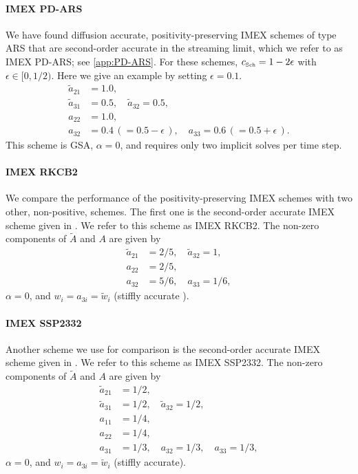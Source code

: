 \paragraph{IMEX PD-ARS}

We have found diffusion accurate, positivity-preserving IMEX schemes of type ARS that are second-order accurate in the streaming limit, which we refer to as IMEX PD-ARS; see \ref{app:PD-ARS}.  
For these schemes, $c_{\mbox{\tiny Sch}}= 1 - 2\epsilon$ with $\epsilon \in [0, 1/2)$.
Here we give an example by setting $\epsilon=0.1$.
\begin{align*}
  \tilde{a}_{21} & = 1.0, \\
  \tilde{a}_{31} & = 0.5, \quad \tilde{a}_{32} = 0.5, \\
  a_{22} & = 1.0, \nonumber \\
  a_{32} & = 0.4 \,( = 0.5 - \epsilon\,), \quad a_{33} = 0.6 \,( = 0.5 + \epsilon\,). 
\end{align*}
This scheme is GSA, $\alpha=0$, and requires only two implicit solves per time step.  

\paragraph{IMEX RKCB2}

We compare the performance of the positivity-preserving IMEX schemes with two other, non-positive, schemes.  
The first one is the second-order accurate IMEX scheme given in \cite{cavaglieriBewley2015}.  
We refer to this scheme as IMEX RKCB2.  
The non-zero components of $\tilde{A}$ and $A$ are given by
\begin{align*}
  \tilde{a}_{21} &= 2/5, \quad \tilde{a}_{32} = 1, \\
  a_{22} &= 2/5, \nonumber \\
  a_{32} &= 5/6, \quad a_{33} = 1/6,
\end{align*}
$\alpha=0$, and $w_{i} = a_{3i} = \tilde{w}_{i}$ (stiffly accurate \cite{pareschiRusso_2005}).

\paragraph{IMEX SSP2332}

Another scheme we use for comparison is the second-order accurate IMEX scheme given in \cite{pareschiRusso_2005}.  
We refer to this scheme as IMEX SSP2332.  
The non-zero components of $\tilde{A}$ and $A$ are given by
\begin{align*}
  \tilde{a}_{21} &= 1/2, \\
  \tilde{a}_{31} &= 1/2, \quad \tilde{a}_{32} = 1/2, \\
  a_{11} &= 1/4, \\
  a_{22} &= 1/4, \\
  a_{31} &= 1/3, \quad a_{32} = 1/3, \quad a_{33} = 1/3, 
\end{align*}
$\alpha=0$, and $w_{i} = a_{3i} = \tilde{w}_{i}$ (stiffly accurate).

